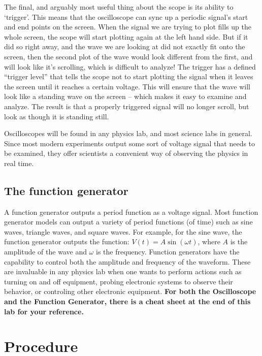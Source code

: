 The final, and arguably most useful thing about the scope is its ability to `trigger'. This means that the oscilloscope can sync up a periodic signal's start and end points on the screen. When the signal we are trying to plot fills up the whole screen, the scope will start plotting again at the left hand side. But if it did so right away, and the wave we are looking at did not exactly fit onto the screen, then the second plot of the wave would look different from the first, and will look like it's scrolling, which is difficult to analyze! The trigger has a defined ``trigger level'' that tells the scope not to start plotting the signal when it leaves the screen until it reaches a certain voltage. This will ensure that the wave will look like a standing wave on the screen -- which makes it easy to examine and analyze. The result is that a properly triggered signal will no longer scroll, but look as though it is standing still. \myskip

Oscilloscopes will be found in any physics lab, and most science labs in general. Since most modern experiments output some sort of voltage signal that needs to be examined, they offer scientists a convenient way of observing the physics in real time. 

\subsection{The function generator}

A function generator outputs a period function as a voltage signal. Most function generator models can output a variety of period functions (of time) such as sine waves, triangle waves, and square waves. For example, for the sine wave, the function generator outputs the function: $V(t) = A \sin(\omega t)$, where $A$ is the amplitude of the wave and $\omega$ is the frequency. Function generators have the capability to control both the amplitude and frequency of the waveform. These are invaluable in any physics lab when one wants to perform actions such as turning on and off equipment, probing electronic systems to observe their behavior,  or controling other electronic equipment.
\vspace{5mm}
\newline
\textbf{For both the Oscilloscope and the Function Generator, there is a cheat sheet at the end of this lab for your reference.}

\section{Procedure}

